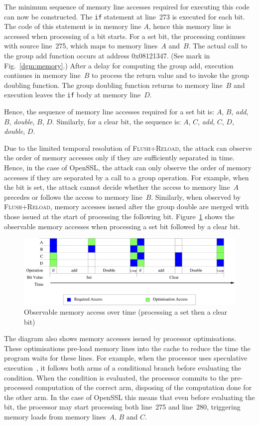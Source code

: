 \documentclass[twocolumn]{svjour3}
\newcommand{\fl}{\textsc{Flu\-sh+\allowbreak Re\-load}\xspace}
\begin{document}
The minimum sequence of memory line accesses required for executing this code can now be constructed.
The \texttt{if} statement at line~273 is executed for each bit.  
The code of this statement is in memory line $A$, hence this memory line is accessed when processing of a bit starts.
For a set bit, the processing continues with source line~275, which maps to memory lines~$A$ and~$B$.
The actual call to the group add function occurs at address 0x08121347.
(See mark in Fig.~\ref{dgm:memory}.)
After a delay for computing the group add, execution continues in memory line~$B$ to process the return value and 
to invoke the group doubling function.
The group doubling function returns to memory line~$B$ and execution leaves the \texttt{if} body at memory line~$D$.

Hence, the sequence of memory line accesses required for a set bit is: $A$, $B$, \textit{add}, $B$, \textit{double}, $B$, $D$.
Similarly, for a clear bit, the sequence is: $A$, $C$, \textit{add}, $C$, $D$, \textit{double}, $D$.

Due to the limited temporal resolution of \fl, the attack can observe the order of memory accesses only
if they are sufficiently separated in time.
Hence, in the case of OpenSSL, the attack can only observe the order of memory accesses if they are separated by a call
to a group operation.
For example, when the bit is set, the attack cannot decide whether the access to memory line~$A$ precedes or follows the access
to memory line~$B$.
Similarly, when observed by \fl, memory accesses issued after the group double are merged with those 
issued at the start of processing the following bit.
Figure~\ref{dgm:temporal} shows the observable memory accesses when processing a set bit followed by
a clear bit.

\begin{figure}[htb]
\centering\includegraphics[width=\columnwidth]{temporal}
\caption{Observable memory access over time (processing a set then  a clear bit)\label{dgm:temporal}}
\end{figure}

The diagram also shows memory accesses issued by processor optimisations.
These optimisations pre-load memory lines into the cache to reduce the time the program waits for these lines.
For example, when the processor uses speculative execution~\cite{uht95disjoint}, it follows both arms of a conditional
branch before evaluating the condition.
When the condition is evaluated, the processor commits to the pre-processed computation of the correct arm,
disposing of the computation done for the other arm. 
In the case of OpenSSL this means that even before evaluating the bit, 
the processor may start processing both line~275 and line~280, triggering memory loads from memory lines~$A$, $B$ and $C$.
\end{document}
